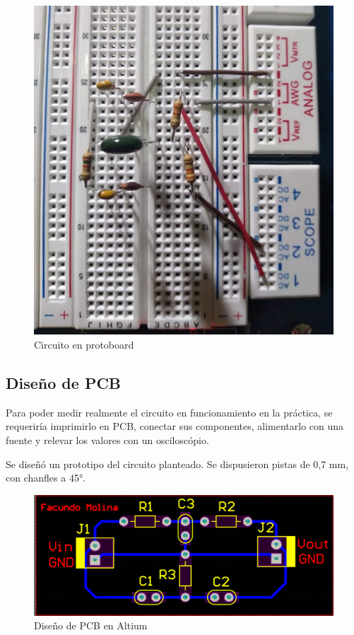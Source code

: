 \begin{figure}[H]
	\centering
	\includegraphics[scale=0.4]{../Informe/Imagenes/NotchProto.jpeg}
	\caption{Circuito en protoboard}
\end{figure}

\subsection{Diseño de PCB}

Para poder medir realmente el circuito en funcionamiento en la práctica, se requeriría imprimirlo en PCB, conectar sus componentes, alimentarlo con una fuente y relevar los valores con un osciloscópio. 

Se diseñó un prototipo del circuito planteado. Se dispusieron pistas de 0,7 mm, con chanfles a 45°. 

\begin{figure}[H]
	\centering
	\includegraphics[scale=0.4]{../Informe/Imagenes/PCB.png}
	\caption{Diseño de PCB en Altium}
\end{figure}


